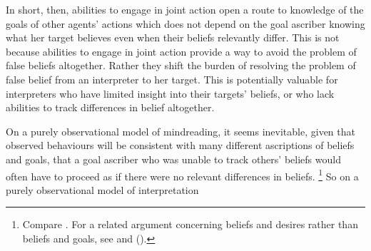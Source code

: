 \documentclass[14pt,a4paper]{extarticle}
\begin{document}
In short, then, abilities to engage in joint action open a route to knowledge of the goals of other agents' actions which does not depend on the goal ascriber knowing what her target believes even when their beliefs relevantly differ.
This is not because abilities to engage in joint action provide a way to avoid the problem of false beliefs altogether.
Rather they shift the burden of resolving the problem of false belief from an interpreter to her target.
This is potentially valuable for interpreters who have limited insight into their targets' beliefs,
or who lack abilities to track differences in belief altogether.

On a purely observational model of mindreading,
it seems inevitable,
given that observed behaviours will be consistent with many different ascriptions of beliefs and goals,
that a goal ascriber who was unable to track others' beliefs 
would often have to proceed as if there were no relevant differences in beliefs.%
\footnote{
Compare \citet[p.\ 49]{Bennett:1976rg}.  For a related argument concerning beliefs and desires rather than beliefs and goals, see 
	\citet[p.\ 17]{Davidson:1984pr}
and
	(\citeyear[pp.\ 159--167]{Davidson:1984wh}).
}
So on a purely observational model of interpretation
\end{document}
